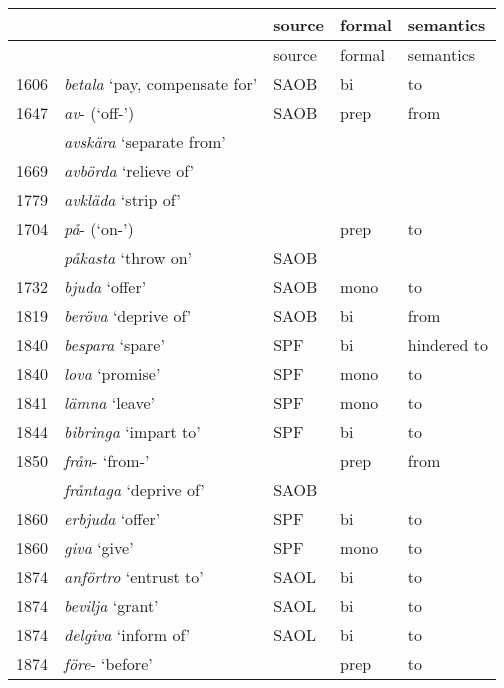 \documentclass[output=paper]{langscibook}
\begin{document}
\begin{longtable}{ll lll}
\lsptoprule & & source & formal  & semantics\\\midrule\endfirsthead\midrule & & source & formal  & semantics\\\midrule\endhead\endfoot\lspbottomrule\endlastfoot

1606 & \textit{betala} ‘pay, compensate for’ &     SAOB & bi   & to\\
1647 & \textit{av}{}- (‘off-’)               &     SAOB & prep & from\\
     & \textit{avskära} ‘separate from’      &          &\\
1669 & \textit{avbörda} ‘relieve of’         &          &\\
1779 & \textit{avkläda} ‘strip of’           &          &\\
1704 & \textit{på}{}- (‘on-’)                &          & prep  & to\\
     & \textit{påkasta} ‘throw on’           &     SAOB &\\
1732 & \textit{bjuda} ‘offer’                &     SAOB & mono &  to\\
1819 & \textit{beröva} ‘deprive of’          &     SAOB & bi  & from\\
1840 & \textit{bespara} ‘spare’              &      SPF & bi  & hindered to\\
1840 & \textit{lova} ‘promise’               &      SPF & mono & to\\
1841 & \textit{lämna} ‘leave’                &      SPF & mono & to\\
1844 & \textit{bibringa} ‘impart to’         &      SPF & bi   & to\\
1850 & \textit{från}{}- ‘from-’              &          & prep & from\\
     & \textit{fråntaga} ‘deprive of’        &     SAOB &\\
1860 & \textit{erbjuda} ‘offer’              &     SPF  & bi   & to\\
1860 & \textit{giva} ‘give’                  &      SPF & mono & to\\
1874 & \textit{anförtro} ‘entrust to’        &     SAOL & bi   & to\\
1874 & \textit{bevilja} ‘grant’              &     SAOL & bi   & to\\
1874 & \textit{delgiva} ‘inform of’          &     SAOL & bi   & to\\
1874 & \textit{före}{}-  ‘before’            &          & prep & to\\

\end{longtable}
\end{document}
